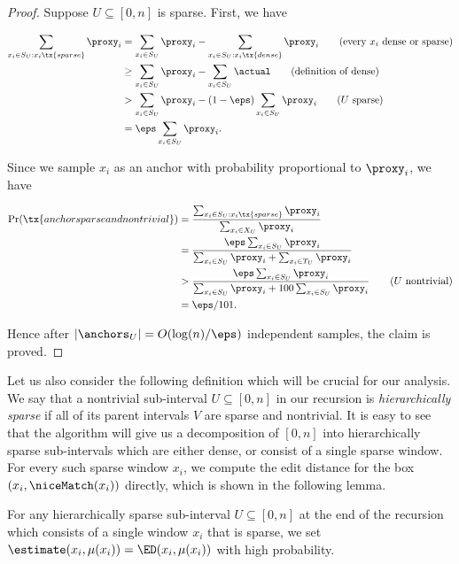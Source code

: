 \begin{proof}
    Suppose $U \subseteq [0, n]$ is sparse. First, we have
    
    \begin{align}
    \sum_{x_i \in S_U : x_i \tx{ sparse}}\proxy_i &= \sum_{x_i \in S_U}\proxy_i - \sum_{x_i \in S_U : x_i \tx{ dense}}\proxy_i \tag{every $x_i$ dense or sparse}\\
    &\geq \sum_{x_i \in S_U}\proxy_i - \sum_{x_i \in S_U}\actual \tag{definition of dense}\\
    &> \sum_{x_i \in S_U}\proxy_i - (1-\eps)\sum_{x_i \in S_U}\proxy_i \tag{$U$ sparse}\\
    &= \eps \sum_{x_i \in S_U}\proxy_i. \nonumber
\end{align}

Since we sample $x_i$ as an anchor with probability proportional to $\proxy_i$, we have

\begin{align*}
\Pr(\tx{anchor sparse and nontrivial}) &= \frac{\sum_{x_i \in S_U : x_i \tx{ sparse}}\proxy_i}{\sum_{x_i \in X_U}\proxy_i} \\
&= \frac{\eps \sum_{x_i \in S_U}\proxy_i}{\sum_{x_i \in S_U}\proxy_i + \sum_{x_i \in T_U}\proxy_i} \\
&> \frac{\eps \sum_{x_i \in S_U}\proxy_i}{\sum_{x_i \in S_U}\proxy_i + 100\sum_{x_i \in S_U}\proxy_i} \tag{$U$ nontrivial}\\
&= \eps/101.
\end{align*}

Hence after $|\anchors_U| = O(\log(n)/\eps)$ independent samples, the claim is proved.
\end{proof}

Let us also consider the following definition which will be crucial for our analysis. 
We say that a nontrivial sub-interval $U \subseteq [0, n]$ in our recursion is \emph{hierarchically sparse} if all of its parent intervals $V$ are sparse and nontrivial. 
It is easy to see that the algorithm will give us a decomposition of $[0, n]$ into hierarchically sparse sub-intervals which are either dense, or consist of a single sparse window. 
For every such sparse window $x_i$, we compute the edit distance for the box $(x_i, \niceMatch(x_i))$ directly, which is shown in the following lemma. 

\begin{lemma}
    \label{lem:sparse-correctness}
    For any hierarchically sparse sub-interval $U \subseteq [0, n]$ at the end of the recursion which consists of a single window $x_i$ that is sparse, we set $\estimate(x_i, \mu(x_i)) = \ED(x_i, \mu(x_i))$ with high probability.
\end{lemma}

